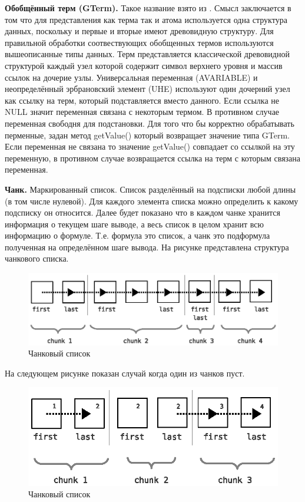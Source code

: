 \textbf{Обобщённый терм (GTerm).} Такое название взято из \cite{NNN}. Смысл заключается в том что для представления как терма так и атома используется одна структура данных, поскольку и первые и вторые имеют древовидную структуру. Для правильной обработки соотвествующих обобщенных термов используются вышеописанные типы данных. Терм представляется классической древовидной структурой каждый узел которой содержит символ верхнего уровня и массив ссылок на дочерие узлы. Универсальная переменная (AVARIABLE) и неопределённый эрбрановский элемент (UHE) используют один дочерний узел как ссылку на терм, который подставляется вместо данного. Если ссылка не NULL значит переменная связана с некоторым термом. В противном случае переменная свободня для подстановки. Для того что бы корректно обрабатывать перменные, задан метод getValue() который возвращает значение типа GTerm. Если переменная не связана то значение getValue() совпадает со ссылкой на эту переменную, в противном случае возвращается ссылка на терм с которым связана переменная.

\textbf{Чанк.} Маркированный список. Список разделённый на подсписки любой длины (в том числе нулевой). Для каждого элемента списка можно определить к какому подсписку он относится. Далее будет показано что в каждом чанке хранится информация о текущем шаге выводе, а весь список в целом хранит всю информацию о формуле. Т.е. формула это список, а чанк это подформула полученная на определённом шаге вывода. На рисунке представлена структура чанкового списка.

\begin{figure}[h]
	\centering
	\includegraphics[width=0.6\linewidth]{pics/Chunk.eps}
	\caption{Чанковый список}
	\label{fig:chank1}
\end{figure}

На следующем рисунке показан случай когда один из чанков пуст.

\begin{figure}[h]
	\centering
	\includegraphics[width=0.6\linewidth]{pics/Chunk2.eps}
	\caption{Чанковый список}
	\label{fig:chank2}
\end{figure}

